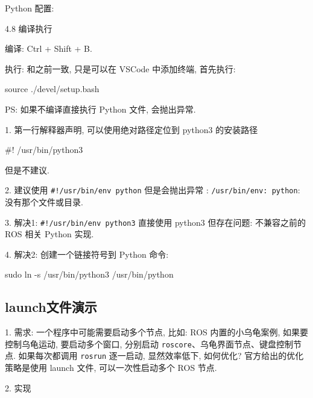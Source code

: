 \documentclass[openany, fontset=windowsold]{ctexbook}
\theoremstyle{kaiti}
\theoremstyle{normal}
\begin{document}
Python 配置:


4.8 编译执行

编译: Ctrl + Shift + B.

执行: 和之前一致, 只是可以在 VSCode 中添加终端, 首先执行:

\begin{bash}
  source ./devel/setup.bash
\end{bash}

PS: 如果不编译直接执行 Python 文件, 会抛出异常.

1. 第一行解释器声明, 可以使用绝对路径定位到 python3 的安装路径 

\begin{bash}
  #! /usr/bin/python3
\end{bash}

但是不建议.

2. 建议使用 \verb|#!/usr/bin/env python| 但是会抛出异常 : \verb|/usr/bin/env: python|: 没有那个文件或目录.

3. 解决1: \verb|#!/usr/bin/env python3| 直接使用 python3 但存在问题: 不兼容之前的 ROS 相关 Python 实现.

4. 解决2: 创建一个链接符号到 Python 命令:

\begin{bash}
  sudo ln -s /usr/bin/python3 /usr/bin/python
\end{bash}

\subsection{launch文件演示}

1. 需求: 一个程序中可能需要启动多个节点, 比如: ROS 内置的小乌龟案例, 如果要控制乌龟运动, 要启动多个窗口, 分别启动 \verb|roscore|、乌龟界面节点、键盘控制节点. 如果每次都调用 \verb|rosrun| 逐一启动, 显然效率低下, 如何优化? 官方给出的优化策略是使用 launch 文件, 可以一次性启动多个 ROS 节点.

2. 实现
\end{document}
